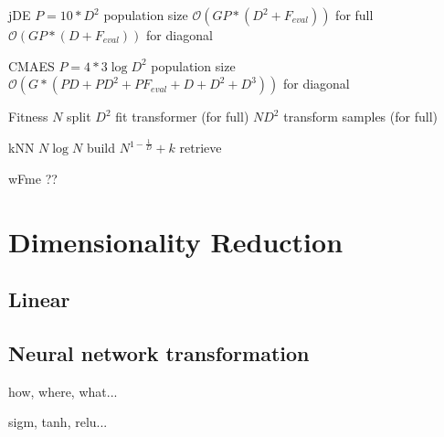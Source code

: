 \documentclass[12pt,a4paper]{report}
\begin{document}
jDE
$P=10*D^2$ population size
$\mathcal{O}(GP*(D^2+F_{eval}))$ for full
$\mathcal{O}(GP*(D+F_{eval}))$ for diagonal

CMAES
$P=4*3\log{D^2}$ population size
$\mathcal{O}(G*(PD+PD^2+PF_{eval}+D+D^2+D^3))$ for diagonal

Fitness
$N$ split
$D^2$ fit transformer (for full)
$ND^2$ transform samples (for full)

kNN
$N\log{N}$ build
$N^{1-\frac{1}{D}}+k$ retrieve

wFme ??



\chapter{Dimensionality Reduction} \label{chap:dr}


\section{Linear} \label{chap:dr:linear}

\section{Neural network transformation} \label{chap:dr:nn}

how, where, what...

sigm, tanh, relu...

\end{document}

